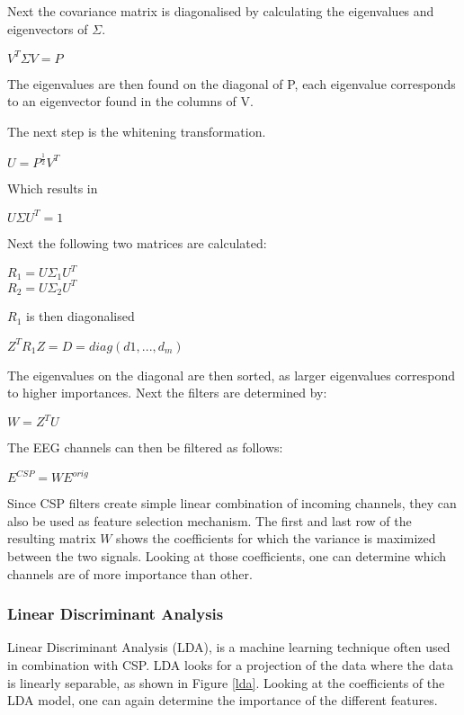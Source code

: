 \npar

Next the covariance matrix is diagonalised by calculating the eigenvalues and eigenvectors of $\Sigma$.
\begin{center}
$V^T\Sigma V = P$
\end{center}
The eigenvalues are then found on the diagonal of P, each eigenvalue corresponds to an eigenvector found in the columns of V.

\npar

The next step is the whitening transformation.
\begin{center}
$U = P^{\frac{1}{2}}V^T$ \\
\end{center}
Which results in
\begin{center}
$U\Sigma U^T = 1$
\end{center}
Next the following two matrices are calculated:
\begin{center}
$R_1 = U\Sigma_1U^T$\\
$R_2 = U\Sigma_2U^T$
\end{center}
$R_1$ is then diagonalised
\begin{center}
$Z^TR_1Z = D = diag(d1, ..., d_m)$
\end{center}
The eigenvalues on the diagonal are then sorted, as larger eigenvalues correspond to higher importances. %
Next the filters are determined by:
\begin{center}
$W = Z^TU$
\end{center}
The EEG channels can then be filtered as follows:
\begin{center}
$E^{CSP} = WE^{orig}$
\end{center}

\npar

Since CSP filters create simple linear combination of incoming channels, they can also be used as feature selection mechanism. The first and last row of the resulting matrix $W$ shows the coefficients for which the variance is maximized between the two signals. Looking at those coefficients, one can determine which channels are of more importance than other.

\subsubsection{Linear Discriminant Analysis}
Linear Discriminant Analysis (LDA), is a machine learning technique often used in combination with CSP\cite{ErrorPotentials,svmldacomp,currTrends}. LDA looks for a projection of the data where the data is linearly separable, as shown in Figure \ref{lda}. Looking at the coefficients of the LDA model, one can again determine the importance of the different features.

